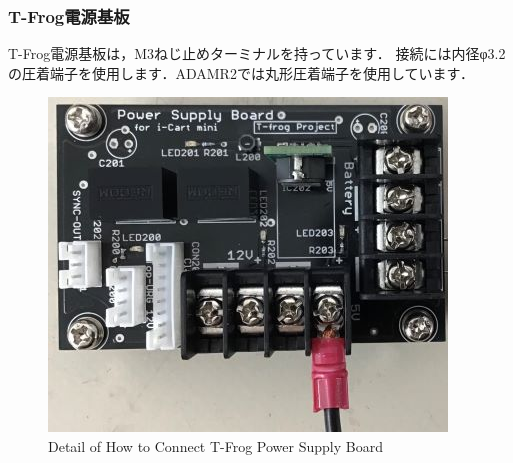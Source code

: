 \documentclass[{../../master}]{subfiles}
\begin{document}
  \subsubsection{T-Frog電源基板}
  T-Frog電源基板は，M3ねじ止めターミナルを持っています．
  接続には内径φ3.2の圧着端子を使用します．ADAMR2では丸形圧着端子を使用しています．

  \begin{figure}[ht]
    \centering
    \includegraphics[width=65truemm, clip]{images/t-frog.jpg}
    \caption{Detail of How to Connect T-Frog Power Supply Board}
    \label{fig:t-frog}
  \end{figure}
\end{document}

